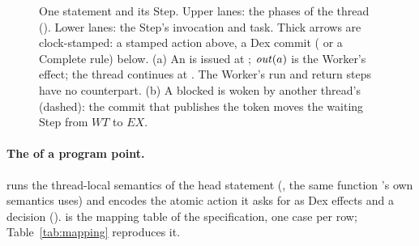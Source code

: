 \begin{figure}[t]
\caption{One \Lang{} statement and its Step. Upper lanes: the phases of the
thread (). Lower lanes: the Step's invocation and task. Thick
arrows are clock-stamped: a stamped \Lang{} action above, a Dex commit
( or a Complete rule) below. (a) An  is
issued at ; $\mathit{out}(a)$ is the Worker's effect; the
thread continues at . The Worker's run and
return steps have no \Lang{} counterpart. (b) A blocked  is woken
by another thread's  (dashed): the commit that publishes the
token moves the waiting Step from $\mathit{WT}$ to $\mathit{EX}$.}
\label{fig:lifecycle}
\end{figure}

\paragraph{The  of a program point.}
 runs the thread-local semantics of the head statement
(, the same function \Lang{}'s own semantics
uses) and encodes the atomic action it asks for as Dex effects and a
decision ().  is the mapping table of
the specification, one case per row; Table~\ref{tab:mapping} reproduces it.

